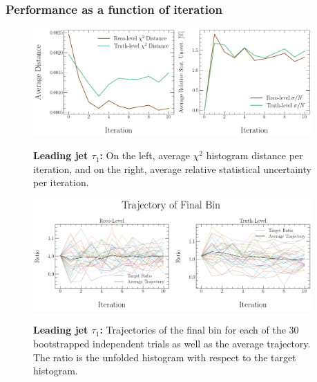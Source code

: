 \subsubsection{Performance as a function of iteration}
\begin{figure}[!htb]
\centering
\includegraphics[width=0.95\textwidth]{figures/num_iterations_study/tau1_trackj1/iteration_study_30x10-distances-and-stat-uncert.png}\\
\caption{\textbf{Leading jet $\tau_1$:} On the left, average $\chi^2$ histogram distance per iteration, and on the right, average relative statistical uncertainty per iteration.}
\label{fig:num_iterations:tau1_distances_stat_uncert}
\end{figure}
\begin{figure}[!htb]
\centering
\includegraphics[width=0.95\textwidth]{figures/num_iterations_study/tau1_trackj1/iteration_study_30x10-final_bin.png}\\
\caption{\textbf{Leading jet $\tau_1$:} Trajectories of the final bin for each of the 30 bootstrapped independent trials as well as the average trajectory. The ratio is the unfolded histogram with respect to the target histogram.}
\label{fig:num_iterations:tau1_final_bin}
\end{figure}
\clearpage



